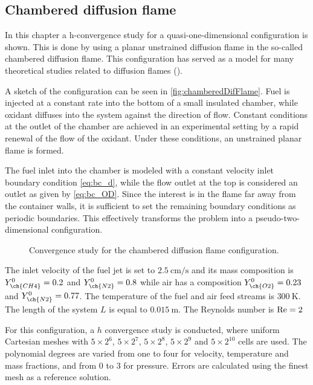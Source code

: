 \subsection{Chambered diffusion flame}\label{ss:UDF}
In this chapter a h-convergence study for a quasi-one-dimensional configuration is shown. This is done by using a planar unstrained diffusion flame in the so-called chambered diffusion flame. This configuration has served as a model for many theoretical studies related to diffusion flames (\cite{matalonEffectThermalExpansion2010,rameauNumericalBifurcationChambered1985,matalonDiffusionFlamesChamber1980}). 

A sketch of the configuration can be seen in \cref{fig:chamberedDifFlame}. Fuel is injected at a constant rate into the bottom of a small insulated chamber, while oxidant diffuses into the system against the direction of flow. Constant conditions at the outlet of the chamber are achieved in an experimental setting by a rapid renewal of the flow of the oxidant. Under these conditions, an unstrained planar flame is formed.

The fuel inlet into the chamber is modeled with a constant velocity inlet boundary condition \cref{eq:bc_d}, while the flow outlet at the top is considered an outlet as given by \cref{eq:bc_OD}. Since the interest is in the flame far away from the container walls, it is sufficient to set the remaining boundary conditions as periodic boundaries. This effectively transforms the problem into a pseudo-two-dimensional configuration.

\begin{figure}[t!]
	\centering
	\pgfplotsset{width=0.34\textwidth, compat=1.3}
	\caption{Convergence study for the chambered diffusion flame configuration.}
	\label{ConvergenceDiffFlame}
\end{figure}
The inlet velocity of the fuel jet is set to $\SI{2.5}{\centi\meter \per \second}$ and its mass composition is $Y^0_{\ch{CH4}} = 0.2$ and $Y^0_{\ch{N2}} = 0.8$ while air has a composition $Y^0_{\ch{O2}} = 0.23$ and $Y^0_{\ch{N2}} = 0.77$. The temperature of the fuel and air feed streams is $\SI{300}{\kelvin}$. The length of the system $L$ is equal to $\SI{0.015}{\meter}$. The Reynolds number is $\text{Re} = 2$

For this configuration, a $h$ convergence study is conducted, where uniform Cartesian meshes with $5\times2^6$, $5\times2^7$, $5\times2^8$,  $5\times2^9$ and $5\times2^{10}$  cells are used. The polynomial degrees are varied from one to four for velocity, temperature and mass fractions, and from 0 to 3 for pressure.  Errors are calculated using the finest mesh as a reference solution.  

